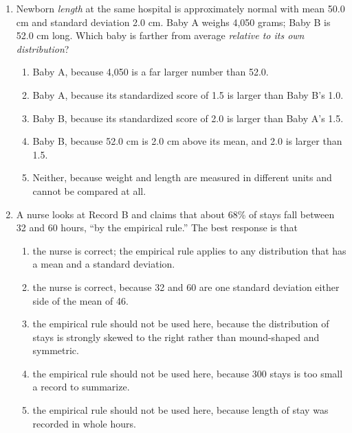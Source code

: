\begin{enumerate}[leftmargin=1.9em, itemsep=0.13in]
  \boxguard[12]
  \item Newborn \emph{length} at the same hospital is approximately normal with mean 50.0 cm and
        standard deviation 2.0 cm. Baby A weighs 4,050 grams; Baby B is 52.0 cm long. Which baby
        is farther from average \emph{relative to its own distribution}?
        \begin{enumerate}[label=\textbf{(\Alph*)}, leftmargin=2.2em, itemsep=2pt]
          \item Baby A, because 4,050 is a far larger number than 52.0.
          \item Baby A, because its standardized score of 1.5 is larger than Baby B's 1.0.
          \item Baby B, because its standardized score of 2.0 is larger than Baby A's 1.5.
          \item Baby B, because 52.0 cm is 2.0 cm above its mean, and 2.0 is larger than 1.5.
          \item Neither, because weight and length are measured in different units and cannot be
                compared at all.
                      \rule{0pt}{0.3in}\hfill{}
        \end{enumerate}

  \item A nurse looks at Record B and claims that about 68\% of stays fall between 32 and 60
        hours, ``by the empirical rule.'' The best response is that
        \begin{enumerate}[label=\textbf{(\Alph*)}, leftmargin=2.2em, itemsep=2pt]
          \item the nurse is correct; the empirical rule applies to any distribution that has a
                mean and a standard deviation.
          \item the nurse is correct, because 32 and 60 are one standard deviation either side
                of the mean of 46.
          \item the empirical rule should not be used here, because the distribution of stays is
                strongly skewed to the right rather than mound-shaped and symmetric.
          \item the empirical rule should not be used here, because 300 stays is too small a
                record to summarize.
          \item the empirical rule should not be used here, because length of stay was recorded
                in whole hours.
                      \rule{0pt}{0.3in}\hfill{}
        \end{enumerate}

\end{enumerate}


